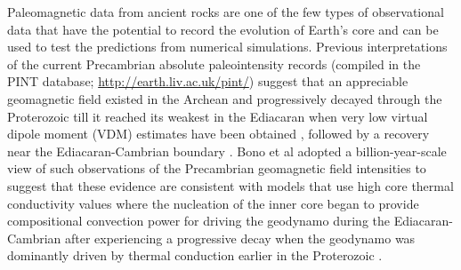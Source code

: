 \documentclass[9pt,twocolumn,twoside,lineno]{pnas-new}
\begin{document}
Paleomagnetic data from ancient rocks are one of the few types of observational data that have the potential to record the evolution of Earth’s core and can be used to test the predictions from numerical simulations. Previous interpretations of the current Precambrian absolute paleointensity records (compiled in the PINT database; \url{http://earth.liv.ac.uk/pint/}) suggest that an appreciable geomagnetic field existed in the Archean and progressively decayed through the Proterozoic till it reached its weakest in the Ediacaran when very low virtual dipole moment (VDM) estimates have been obtained \cite{Bono2019a, Shcherbakova2019a, Thallner2021b, Lloyd2021a}, followed by a recovery near the Ediacaran-Cambrian boundary \cite{Thallner2021a}. Bono et al \cite{Bono2019a} adopted a billion-year-scale view of such observations of the Precambrian geomagnetic field intensities to suggest that these evidence are consistent with models that use high core thermal conductivity values where the nucleation of the inner core began to provide compositional convection power for driving the geodynamo during the Ediacaran-Cambrian after experiencing a progressive decay when the geodynamo was dominantly driven by thermal conduction earlier in the Proterozoic \cite{Driscoll2016a, Davies2021a}. 

\end{document}
